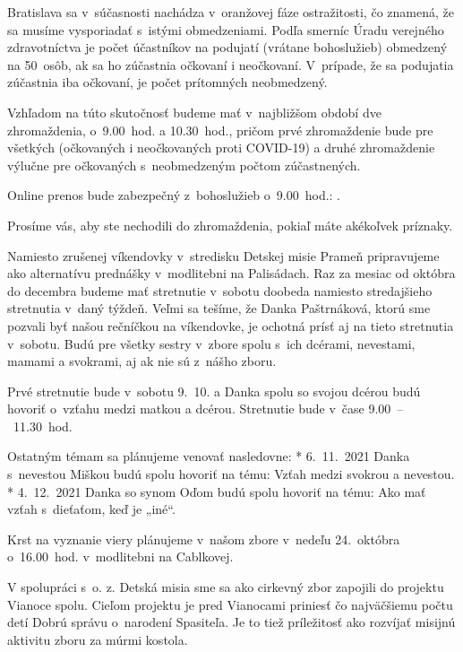 Bratislava sa v~súčasnosti nachádza v~oranžovej fáze ostražitosti, čo znamená, že sa musíme vysporiadať s~istými obmedzeniami. Podľa smerníc Úradu verejného zdravotníctva je počet účastníkov na podujatí (vrátane bohoslužieb) obmedzený na 50~osôb, ak sa ho zúčastnia očkovaní i neočkovaní. V~prípade, že sa podujatia zúčastnia iba očkovaní, je počet prítomných neobmedzený.

Vzhľadom na túto skutočnosť budeme mať v~najbližšom období dve zhromaždenia, o~9.00~hod. a 10.30~hod., pričom prvé zhromaždenie bude pre všetkých (očkovaných i neočkovaných proti COVID-19) a druhé zhromaždenie výlučne pre očkovaných s~neobmedzeným počtom zúčastnených.

Online prenos bude zabezpečný z~bohoslužieb o~9.00~hod.: .

Prosíme vás, aby ste nechodili do zhromaždenia, pokiaľ máte akékoľvek príznaky.


Namiesto zrušenej víkendovky v~stredisku Detskej misie Prameň pripravujeme ako alternatívu prednášky v~modlitebni na Palisádach. Raz za mesiac od októbra do decembra budeme mať stretnutie v~sobotu doobeda namiesto stredajšieho stretnutia v~daný týždeň. Veľmi sa tešíme, že Danka Paštrnáková, ktorú sme pozvali byť našou rečníčkou na víkendovke, je ochotná prísť aj na tieto stretnutia v~sobotu. Budú pre všetky sestry v~zbore spolu s~ich dcérami, nevestami, mamami a svokrami, aj ak nie sú z~nášho zboru.

Prvé stretnutie bude v~sobotu 9.~10. a Danka spolu so svojou dcérou budú hovoriť o~vzťahu medzi matkou a dcérou. Stretnutie bude v~čase 9.00~--~11.30~hod.

Ostatným témam sa plánujeme venovať nasledovne:
\begitems
* 6.~11.~2021 Danka s~nevestou Miškou budú spolu hovoriť na tému: Vzťah medzi svokrou a nevestou.
* 4.~12.~2021 Danka so synom Oďom budú spolu hovoriť na tému: Ako mať vzťah s~dieťaťom, keď je „iné“.
\enditems

Krst na vyznanie viery plánujeme v~našom zbore v~nedeľu 24.~októbra o~16.00~hod. v~modlitebni na Cablkovej.
\vfill\break


V spolupráci s~o. z. Detská misia sme sa ako cirkevný zbor zapojili do projektu Vianoce spolu. Cieľom projektu je pred Vianocami priniesť čo najväčšiemu počtu detí Dobrú správu o~narodení Spasiteľa. Je to tiež príležitosť ako rozvíjať misijnú aktivitu zboru za múrmi kostola.

